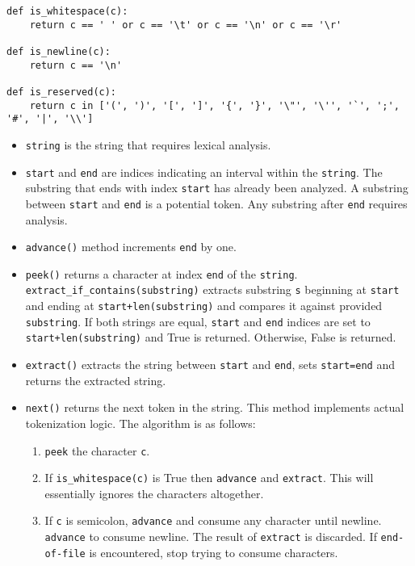 \begin{lstlisting}
def is_whitespace(c):
    return c == ' ' or c == '\t' or c == '\n' or c == '\r'

def is_newline(c):
    return c == '\n'

def is_reserved(c): 
    return c in ['(', ')', '[', ']', '{', '}', '\"', '\'', '`', ';', '#', '|', '\\']
\end{lstlisting}


\begin{itemize}
\item
\texttt{string} is the string that requires lexical analysis.

\item
\texttt{start} and \texttt{end} are indices indicating an interval within the \texttt{string}. The substring that ends with index \texttt{start} has already been analyzed. A substring between \texttt{start} and \texttt{end} is a potential token. Any substring after \texttt{end} requires analysis.

\item
\texttt{advance()} method increments \texttt{end} by one.

\item
\texttt{peek()} returns a character at index \texttt{end} of the \texttt{string}.
\texttt{extract\_if\_contains(substring)} extracts substring \texttt{s} beginning at \texttt{start} and ending at \texttt{start+len(substring)} and compares it against provided \texttt{substring}. If both strings are equal, \texttt{start} and \texttt{end} indices are set to \texttt{start+len(substring)} and True is returned. Otherwise, False is returned.

\item
\texttt{extract()} extracts the string between \texttt{start} and \texttt{end}, sets \texttt{start=end} and returns the extracted string.

\item
\texttt{next()} returns the next token in the string. This method implements actual tokenization logic. The algorithm is as follows:
\begin{enumerate}
	\item
	\texttt{peek} the character \texttt{c}.
	
	\item
	If \texttt{is\_whitespace(c)} is True then \texttt{advance} and \texttt{extract}. This will essentially ignores the characters altogether.

	\item
	If \texttt{c} is semicolon, \texttt{advance} and consume any character until newline. \texttt{advance} to consume newline. The result of \texttt{extract} is discarded. If \texttt{end-of-file} is encountered, stop trying to consume characters.


\end{enumerate}
\end{itemize}
